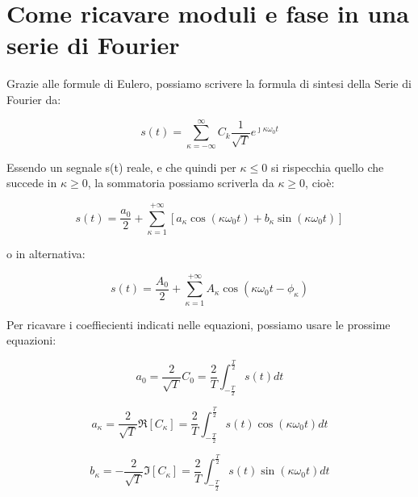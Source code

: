 \newpage

\section{Come ricavare moduli e fase in una serie di Fourier} 

Grazie alle formule di Eulero, possiamo scrivere la formula di sintesi della Serie di Fourier da: 

{
    \Large 
    \begin{equation}
        s(t) 
        = 
        \sum_{\kappa = - \infty}^{\infty} 
        C_k \frac{1}{\sqrt{T}} e^{\jmath \kappa \omega_0 t}
    \end{equation}
} 

Essendo un segnale s(t) reale, e che quindi per $\kappa \le 0$ si rispecchia quello che succede in $\kappa \ge 0$, 
la sommatoria possiamo scriverla da $\kappa \ge 0$, cioè: 

{
    \Large 
    \begin{equation}
        s(t) = \frac{a_0}{2} 
        +
        \sum_{\kappa = 1}^{+ \infty} [a_\kappa \cos(\kappa \omega_0 t) + b_\kappa \sin(\kappa \omega_0 t)] 
    \end{equation}
} 

o in alternativa: 

{
    \Large 
    \begin{equation}
        s(t) 
        = 
        \frac{A_0}{2} 
        + 
        \sum_{\kappa = 1}^{+ \infty} A_\kappa \cos(\kappa \omega_0 t - \phi_\kappa)   
    \end{equation}
}

Per ricavare i coeffiecienti indicati nelle equazioni, possiamo usare le prossime equazioni: 

{
    \Large 
    \begin{equation}
        a_0  
        = 
        \frac{2}{\sqrt{T}} C_0 
        = 
        \frac{2}{T} \int_{-\frac{T}{2}}^{\frac{T}{2}} s(t) dt 
    \end{equation}
} 


{
    \Large 
    \begin{equation}
        a_\kappa  
        = 
        \frac{2}{\sqrt{T}} \Re[C_\kappa]
        = 
        \frac{2}{T} \int_{-\frac{T}{2}}^{\frac{T}{2}} s(t) \cos(\kappa \omega_0 t) dt 
    \end{equation}
} 

{
    \Large 
    \begin{equation}
        b_\kappa  
        = 
        -\frac{2}{\sqrt{T}} \Im[C_\kappa]
        = 
        \frac{2}{T} \int_{-\frac{T}{2}}^{\frac{T}{2}} s(t) \sin(\kappa \omega_0 t) dt 
    \end{equation}
} 

